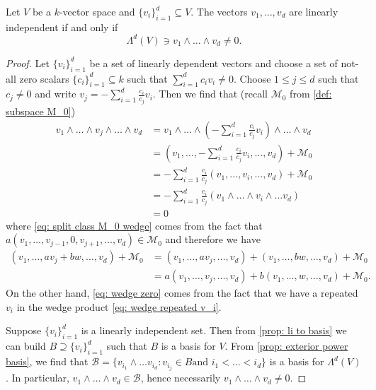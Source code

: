 \begin{proposition}\label{prop: li iff wedge nonzero}
  Let \(V\) be a \(k\)-vector space and \(\{v_i\}_{i=1}^d \subseteq V\). The
  vectors \(v_1, \dots, v_d\) are linearly independent if and only if
  \[
    \Lambda^d(V) \ni v_1 \wedge \dots \wedge v_d \neq 0.
  \] 
\end{proposition}

\begin{proof}
  Let \(\{v_i\}_{i=1}^d\) be a set of linearly dependent vectors and choose
  a set of not-all zero scalars \(\{c_i\}_{i=1}^d \subseteq k\) such that
  \(\sum_{i=1}^d c_i v_i \neq 0\). Choose \(1 \leq j \leq d\) such that \(c_j
  \neq 0\) and write \(v_j = -\sum_{i=1}^d \frac{c_i}{c_j} v_i\). Then we find
  that (recall \(\mathcal M_0\) from \cref{def: subspace M_0})
  \begin{align}
    \nonumber
    v_1 \wedge \dots \wedge v_j \wedge \dots \wedge v_d
    &= v_1 \wedge \dots \wedge \left( - \sum_{i=1}^d \frac{c_i}{c_j} v_i \right)
    \wedge \dots \wedge v_d 
    \\
    \nonumber
    &= \left( v_1, \dots, - \sum_{i=1}^d \frac{c_i}{c_j} v_i, \dots, v_d \right)
    + \mathcal M_0 \\
    \label{eq: split class M_0 wedge}
    &= -\sum_{i=1}^d \frac{c_i}{c_j} (v_1, \dots, v_i, \dots, v_d) + \mathcal
    M_0
    \\
    \label{eq: wedge repeated v_i}
    &= - \sum_{i=1}^d \frac{c_i}{c_j} (v_1 \wedge \dots \wedge v_i \wedge \dots
    v_d)
    \\
    \label{eq: wedge zero}
    &= 0
  \end{align}
  where \cref{eq: split class M_0 wedge} comes from the fact that \(a(v_1, \dots,
  v_{j-1}, 0, v_{j+1}, \dots, v_d) \in \mathcal M_0\) and therefore we have
  \begin{align*}
    (v_1, \dots, a v_j + b w, \dots, v_d) + \mathcal M_0
    &= (v_1, \dots, a v_j, \dots, v_d) + (v_1, \dots, b w, \dots, v_d) 
    + \mathcal M_0 \\
    &= a(v_1, \dots, v_j, \dots, v_d) + b(v_1, \dots, w, \dots, v_d) 
    + \mathcal M_0.
  \end{align*}
  On the other hand, \cref{eq: wedge zero} comes from the fact that we have a
  repeated \(v_i\) in the wedge product \cref{eq: wedge repeated v_i}.

  Suppose \(\{v_i\}_{i=1}^d\) is a linearly independent set. Then from
  \cref{prop: li to basis} we can build \(B \supseteq \{v_i\}_{i=1}^d\) such
  that \(B\) is a basis for \(V\). From \cref{prop: exterior power basis}, we
  find that \(\mathcal B = \{v_{i_1} \wedge \dots v_{i_d} : v_{i_j} \in B \text{
  and } i_1 < \dots < i_d\}\) is a basis for \(\Lambda^d(V)\). In particular,
  \(v_1 \wedge \dots \wedge v_d \in \mathcal B\), hence necessarily \(v_1 \wedge
  \dots \wedge v_d \neq 0\).
\end{proof}

